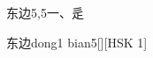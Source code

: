 \begin{entry}{东边}{5,5}{⼀、⾡}
  \begin{phonetics}{东边}{dong1 bian5}[][HSK 1]
  \end{phonetics}
\end{entry}
